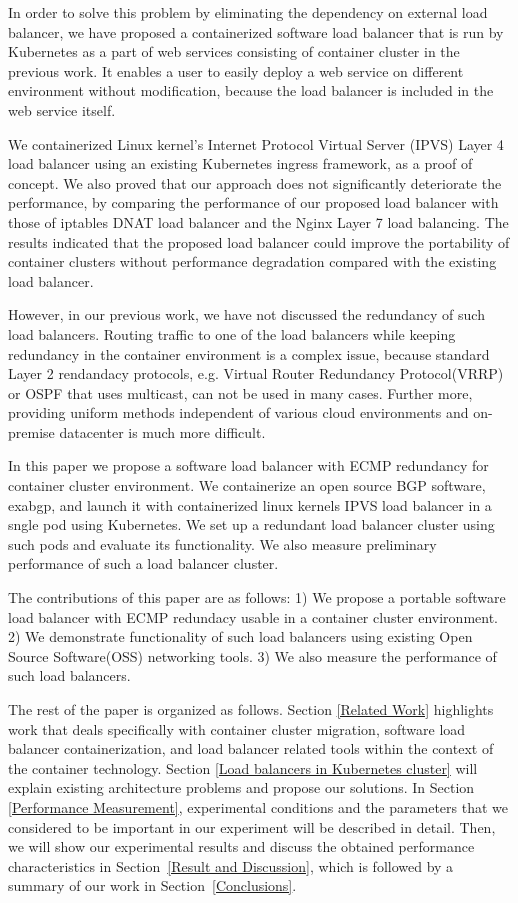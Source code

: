 In order to solve this problem by eliminating the dependency on external load balancer,
we have proposed a containerized software load balancer that is run by Kubernetes as  
a part of web services consisting of container cluster in the previous work\cite{takahashi2018portable}.
It enables a user to easily deploy a web service on different environment without modification, 
because the load balancer is included in the web service itself. 

We containerized Linux kernel's Internet Protocol Virtual Server (IPVS)\cite{Zhang2000} 
Layer 4 load balancer using an existing Kubernetes ingress\cite{K8sIngress2017} framework, as a proof of concept.
%
%
We also proved that our approach does not significantly deteriorate the performance,  
by comparing the performance of our proposed load balancer with those of 
iptables DNAT load balancer and the Nginx Layer 7 load balancing. 
%
The results indicated that the proposed load balancer could improve the portability of container clusters 
without performance degradation compared with the existing load balancer.

However, in our previous work, we have not discussed the redundancy of such load balancers.
Routing traffic to one of the load balancers while keeping redundancy in the container environment is a complex issue,
because standard Layer 2 rendandacy protocols, e.g. Virtual Router Redundancy Protocol(VRRP) or OSPF\cite{moy1997ospf} that uses multicast, 
can not be used in many cases.
Further more, providing uniform methods independent of various cloud environments and on-premise datacenter is much more difficult.   

In this paper we propose a software load balancer with ECMP redundancy for container cluster environment.
We containerize an open source BGP software, exabgp, and launch it with containerized linux kernels IPVS load balancer in a sngle pod using Kubernetes.
We set up a redundant load balancer cluster using such pods and evaluate its functionality.  
We also measure preliminary performance of such a load balancer cluster.

The contributions of this paper are as follows: 
1) We propose a portable software load balancer with ECMP redundacy usable in a container cluster environment.
2) We demonstrate functionality of such load balancers using existing Open Source Software(OSS) networking tools.
3) We also measure the performance of such load balancers.

The rest of the paper is organized as follows.
Section \ref{Related Work} highlights work that deals specifically with container cluster migration, 
software load balancer containerization, and load balancer related tools within the context of the container technology. 
Section \ref{Load balancers in Kubernetes cluster} will explain existing architecture problems and propose our solutions.
In Section \ref{Performance Measurement}, experimental conditions and the parameters 
that we considered to be important in our experiment will be described in detail.
Then, we will show our experimental results and discuss the obtained performance characteristics in Section~\ref{Result and Discussion},  
which is followed by a summary of our work in Section~\ref{Conclusions}.


